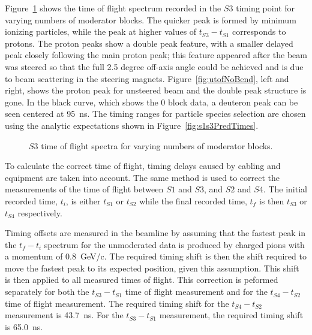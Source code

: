Figure~\ref{fig:s3tof} shows the time of flight spectrum recorded in the $\mathit{S3}$ timing point for varying numbers of moderator blocks.
The quicker peak is formed by minimum ionizing particles, while the peak at higher values of $\mathit{t_{S3}} - \mathit{t_{S1}}$ corresponds to protons.
The proton peaks show a double peak feature, with a smaller delayed peak closely following the main proton peak; this feature appeared after the beam was steered so that the full 2.5 degree off-axis angle could be achieved and is due to beam scattering in the steering magnets.
Figure~\ref{fig:utofNoBend}, left and right, shows the proton peak for unsteered beam and the double peak structure is gone.
In the black curve, which shows the 0 block data, a deuteron peak can be seen centered at 95~ns.
The timing ranges for particle species selection are chosen using the analytic expectations shown in Figure~\ref{fig:s1s3PredTimes}.

\begin{figure}[ht]
  \begin{adjustbox}{max totalsize={.8\textwidth}{.5\textheight},center}
    
  \end{adjustbox}
  \caption{$\mathit{S3}$ time of flight spectra for varying numbers of moderator blocks.}
  \label{fig:s3tof}
\end{figure}

To calculate the correct time of flight, timing delays caused by cabling and equipment are taken into account.
The same method is used to correct the measurements of the time of flight between $\mathit{S1}$ and $\mathit{S3}$, and $\mathit{S2}$ and $\mathit{S4}$.
The initial recorded time, $t_i$, is either $t_{\mathit{S1}}$ or $t_{\mathit{S2}}$ while the final recorded time, $t_f$ is then $t_{\mathit{S3}}$ or $t_{\mathit{S4}}$ respectively.

Timing offsets are measured in the beamline by assuming that the fastest peak in the $t_{f}-t_{i}$ spectrum for the unmoderated data is produced by charged pions with a momentum of 0.8~GeV/c.
The required timing shift is then the shift required to move the fastest peak to its expected position, given this assumption.
This shift is then applied to all measured times of flight.
This correction is peformed separately for both the $t_{\mathit{S3}}-t_{\mathit{S1}}$ time of flight measurement and for the $t_{\mathit{S4}}-t_{\mathit{S2}}$ time of flight measurement.
The required timing shift for the $t_{\mathit{S4}}-t_{\mathit{S2}}$ measurement is 43.7~ns.
For the $t_{\mathit{S3}}-t_{\mathit{S1}}$ measurement, the required timing shift is 65.0~ns.

